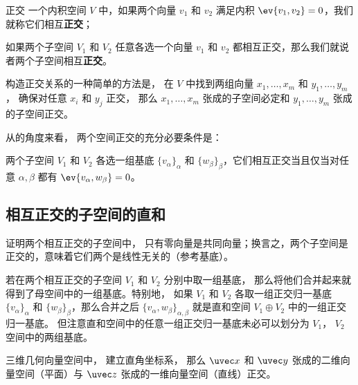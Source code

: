 
\begin{issues}
\issueTODO
\end{issues}



\begin{definition}{正交}
一个内积空间 $V$ 中，如果两个向量 ${v_1}$ 和 ${v_2}$ 满足内积 $\ev{v_1, v_2} = 0$，我们就称它们相互\textbf{正交}；

如果两个子空间 $V_1$ 和 $V_2$ 任意各选一个向量 ${v_1}$ 和 ${v_2}$ 都相互正交，那么我们就说者两个子空间相互\textbf{正交}。
\end{definition}

构造正交关系的一种简单的方法是， 在 $V$ 中找到两组向量 $x_1, \dots, x_m$ 和 $y_1, \dots, y_m$， 确保对任意 $x_i$ 和 $y_j$ 正交， 那么 $x_1, \dots, x_m$ 张成的子空间必定和 $y_1, \dots, y_m$ 张成的子空间正交。

从的角度来看， 两个空间正交的充分必要条件是：
\begin{theorem}{}
两个子空间 $V_1$ 和 $V_2$ 各选一组基底 $\{v_\alpha\}_\alpha$ 和 $\{w_\beta\}_\beta$，它们相互正交当且仅当对任意 $\alpha, \beta$ 都有 $\ev{v_\alpha, w_\beta} = 0$。
\end{theorem}

\subsection{相互正交的子空间的直和}

\begin{exercise}{}
证明两个相互正交的子空间中， 只有零向量是共同向量；换言之，两个子空间是正交的，意味着它们两个是线性无关的（参考基底）。
\end{exercise}

若在两个相互正交的子空间 $V_1$ 和 $V_2$ 分别中取一组基底， 那么将他们合并起来就得到了母空间中的一组基底。特别地， 如果 $V_1$ 和 $V_2$ 各取一组正交归一基底 $\{v_\alpha\}_\alpha$ 和 $\{w_\beta\}_\beta$，那么合并之后 $\{v_\alpha, w_\beta\}_{\alpha, \beta}$ 就是直和空间 $V_1 \oplus V_2$ 中的一组正交归一基底。 但注意直和空间中的任意一组正交归一基底未必可以划分为 $V_1$， $V_2$ 空间中的两组基底。

\begin{example}{}
三维几何向量空间中， 建立直角坐标系， 那么 $\uvec x$ 和 $\uvec y$ 张成的二维向量空间（平面）与 $\uvec z$ 张成的一维向量空间（直线）正交。
\end{example}

